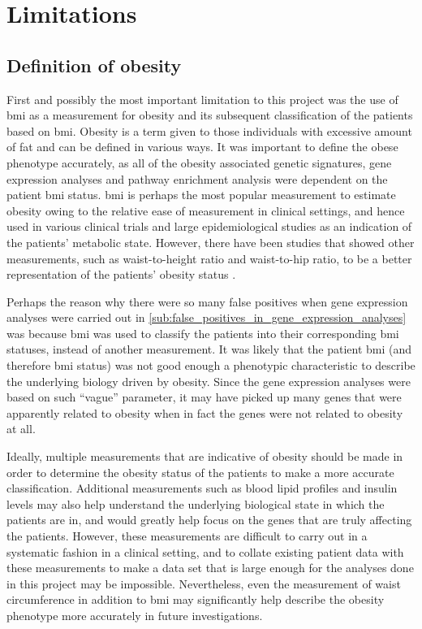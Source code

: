 \section{Limitations}
\label{sec:limitations}

\subsection{Definition of obesity}
\label{sub:discussion_definition_of_obesity}

First and possibly the most important limitation to this project was the use of \gls{bmi} as a measurement for obesity and its subsequent classification of the patients based on \gls{bmi}.
Obesity is a term given to those individuals with excessive amount of fat and can be defined in various ways.
It was important to define the obese phenotype accurately, as all of the obesity associated genetic signatures, gene expression analyses and pathway enrichment analysis were dependent on the patient \gls{bmi} status.
\Gls{bmi} is perhaps the most popular measurement to estimate obesity owing to the relative ease of measurement in clinical settings, and hence used in various clinical trials and large epidemiological studies as an indication of the patients' metabolic state.
However, there have been studies that showed other measurements, such as waist-to-height ratio and waist-to-hip ratio, to be a better representation of the patients' obesity status \citep{Dalton2003,Lee2008}.

Perhaps the reason why there were so many false positives when gene expression analyses were carried out in \cref{sub:false_positives_in_gene_expression_analyses} was because \gls{bmi} was used to classify the patients into their corresponding \gls{bmi} statuses, instead of another measurement.
It was likely that the patient \gls{bmi} (and therefore \gls{bmi} status) was not good enough a phenotypic characteristic to describe the underlying biology driven by obesity.
Since the gene expression analyses were based on such ``vague'' parameter, it may have picked up many genes that were apparently related to obesity when in fact the genes were not related to obesity at all.

Ideally, multiple measurements that are indicative of obesity should be made in order to determine the obesity status of the patients to make a more accurate classification.
Additional measurements such as blood lipid profiles and insulin levels may also help understand the underlying biological state in which the patients are in, and would greatly help focus on the genes that are truly affecting the patients.
However, these measurements are difficult to carry out in a systematic fashion in a clinical setting, and to collate existing patient data with these measurements to make a data set that is large enough for the analyses done in this project may be impossible.
Nevertheless, even the measurement of waist circumference in addition to \gls{bmi} may significantly help describe the obesity phenotype more accurately in future investigations.


